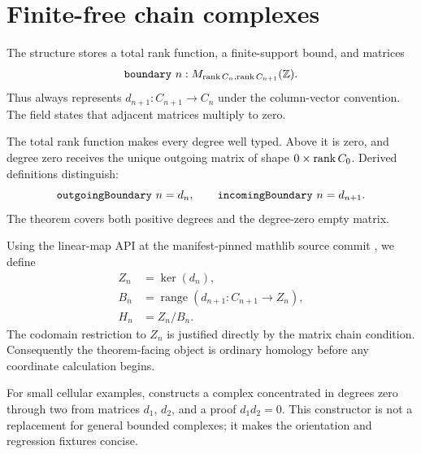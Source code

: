 \section{Finite-free chain complexes}

The structure  stores a total rank function,
a finite-support bound, and matrices
\[
  \texttt{boundary}\ n :
  M_{\operatorname{rank} C_n,\operatorname{rank} C_{n+1}}(\mathbb{Z}).
\]
Thus  always represents
$d_{n+1}\colon C_{n+1}\to C_n$ under the column-vector convention.  The
field  states that adjacent matrices multiply to
zero.

The total rank function makes every degree well typed.  Above
 it is zero, and degree zero receives the unique outgoing
matrix of shape $0\times\operatorname{rank} C_0$.  Derived definitions distinguish:
\[
  \code{outgoingBoundary}\ n=d_n,\qquad
  \code{incomingBoundary}\ n=d_{n+1}.
\]
The theorem  covers both positive degrees and
the degree-zero empty matrix.

Using the linear-map API at the manifest-pinned mathlib source commit
\citep{mathlib4320source}, we define
\[
\begin{aligned}
  Z_n&=\ker(d_n),\\
  B_n&=\operatorname{range}(d_{n+1}\colon C_{n+1}\to Z_n),\\
  H_n&=Z_n/B_n.
\end{aligned}
\]
The codomain restriction to $Z_n$ is justified directly by the matrix chain
condition.  Consequently the theorem-facing object is ordinary homology
before any coordinate calculation begins.

For small cellular examples,
 constructs a complex concentrated in degrees zero through
two from matrices $d_1$, $d_2$, and a proof $d_1d_2=0$.  This constructor is
not a replacement for general bounded complexes; it makes the orientation
and regression fixtures concise.
